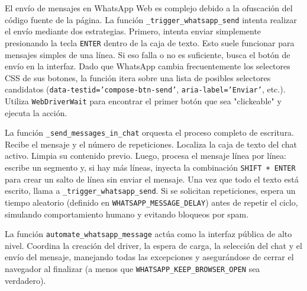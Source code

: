 \documentclass[letterpaper,12pt]{article}
\begin{document}
El envío de mensajes en WhatsApp Web es complejo debido a la ofuscación del código fuente de la página. La función \texttt{\_trigger\_whatsapp\_send} intenta realizar el envío mediante dos estrategias.
Primero, intenta enviar simplemente presionando la tecla \texttt{ENTER} dentro de la caja de texto. Esto suele funcionar para mensajes simples de una línea.
Si eso falla o no es suficiente, busca el botón de envío en la interfaz. Dado que WhatsApp cambia frecuentemente los selectores CSS de sus botones, la función itera sobre una lista de posibles selectores candidatos (\texttt{data-testid='compose-btn-send'}, \texttt{aria-label='Enviar'}, etc.). Utiliza \texttt{WebDriverWait} para encontrar el primer botón que sea "clickeable" y ejecuta la acción.

La función \texttt{\_send\_messages\_in\_chat} orquesta el proceso completo de escritura. Recibe el mensaje y el número de repeticiones. Localiza la caja de texto del chat activo. Limpia su contenido previo. Luego, procesa el mensaje línea por línea: escribe un segmento y, si hay más líneas, inyecta la combinación \texttt{SHIFT + ENTER} para crear un salto de línea sin enviar el mensaje. Una vez que todo el texto está escrito, llama a \texttt{\_trigger\_whatsapp\_send}. Si se solicitan repeticiones, espera un tiempo aleatorio (definido en \texttt{WHATSAPP\_MESSAGE\_DELAY}) antes de repetir el ciclo, simulando comportamiento humano y evitando bloqueos por spam.

La función \texttt{automate\_whatsapp\_message} actúa como la interfaz pública de alto nivel. Coordina la creación del driver, la espera de carga, la selección del chat y el envío del mensaje, manejando todas las excepciones y asegurándose de cerrar el navegador al finalizar (a menos que \texttt{WHATSAPP\_KEEP\_BROWSER\_OPEN} sea verdadero).
\end{document}
